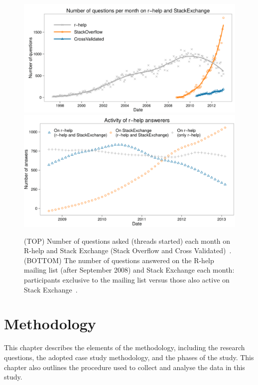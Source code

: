 \documentclass{sig-alternate-05-2015}
\begin{document}
	\begin{figure}
		\centering
		\includegraphics[width=1\columnwidth]{Figures/VasilescuFA1}
		\includegraphics[width=1\columnwidth]{Figures/VasilescuFA2}
		\caption{(TOP) Number of questions asked (threads started) each month on R-help and Stack Exchange (Stack Overflow and Cross Validated)~\cite{Vasilescu2014c}. (BOTTOM) The number of questions answered on the R-help mailing list (after September 2008) and Stack Exchange each month: participants exclusive to the mailing list versus those also active on Stack Exchange~\cite{Vasilescu2014c}.}
		\label{fig:VasilescuFA1}
	\end{figure}


\section{Methodology}
\label{cha:methodology}

	This chapter describes the elements of the methodology, including the research questions, the adopted case study methodology, and the phases of the study.
	This chapter also outlines the procedure used to collect and analyse the data in this study.

\end{document}
